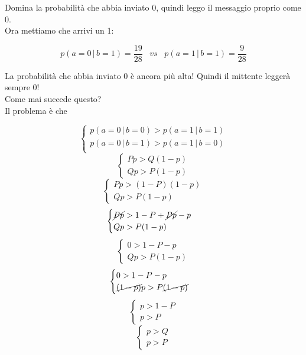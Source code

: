 Domina la probabilità che abbia inviato 0, quindi leggo il messaggio proprio come 0.\\
Ora mettiamo che arrivi un 1:

\begin{equation*}
p(a=0\,|\,b=1) = \frac{19}{28} \; \; \; vs \; \; \; p(a=1\,|\,b=1) = \frac{9}{28}
\end{equation*}

La probabilità che abbia inviato 0 è ancora più alta! Quindi il mittente leggerà sempre 0!\\
Come mai succede questo?\\
Il problema è che

\begin{equation*}
\begin{cases}
p(a=0\,|\,b=0) > p(a=1\,|\,b=1)\\
p(a=0\,|\,b=1) > p(a=1\,|\,b=0)\\
\end{cases}
\end{equation*}
\begin{equation*}
\begin{cases}
Pp > Q(1-p)\\
Qp > P(1-p)
\end{cases}
\end{equation*}
\begin{equation*}
\begin{cases}
Pp > (1-P)(1-p)\\
Qp > P(1-p)
\end{cases}
\end{equation*}
\begin{equation*}
\begin{cases}
\cancel{Pp} > 1 - P + \cancel{Pp} - p\\
Qp > P(1-p)
\end{cases}
\end{equation*}
\begin{equation*}
\begin{cases}
0 > 1 - P - p\\
Qp > P(1-p)
\end{cases}
\end{equation*}
\begin{equation*}
\begin{cases}
0 > 1 - P - p\\
\cancel{(1-p)}p > P\cancel{(1-p)}
\end{cases}
\end{equation*}
\begin{equation*}
\begin{cases}
p > 1 - P\\
p > P
\end{cases}
\end{equation*}
\begin{equation*}
\begin{cases}
p > Q\\
p > P
\end{cases}
\end{equation*}

